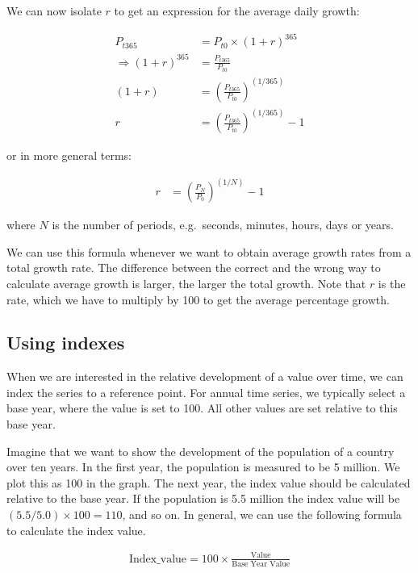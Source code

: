 \documentclass[
]{book}
\begin{document}
We can now isolate \(r\) to get an expression for the average daily growth:

\begin{align}
   P_{t365}&=P_{t0}\times(1+r)^{365}\nonumber\\
   \Rightarrow
   (1+r)^365&=\frac{P_{t365}}{P_{t0}}\nonumber\\
   (1+r)&=\left(\frac{P_{t365}}{P_{t0}}\right)^{(1/365)}\nonumber\\
   r&=\left(\frac{P_{t365}}{P_{t0}}\right)^{(1/365)}-1
\end{align}

or in more general terms:

\begin{align}
   r&=\left(\frac{P_{N}}{P_{0}}\right)^{(1/N)}-1
\end{align}

where \(N\) is the number of periods, e.g.~seconds, minutes, hours, days or years.

We can use this formula whenever we want to obtain average growth rates from a total growth rate. The difference between the correct and the wrong way to calculate average growth is larger, the larger the total growth. Note that \(r\) is the rate, which we have to multiply by 100 to get the average percentage growth.

\hypertarget{using-indexes}{%
\subsection*{Using indexes}\label{using-indexes}}

When we are interested in the relative development of a value over time, we can index the series to a reference point. For annual time series, we typically select a base year, where the value is set to 100. All other values are set relative to this base year.

Imagine that we want to show the development of the population of a country over ten years. In the first year, the population is measured to be 5 million. We plot this as 100 in the graph. The next year, the index value should be calculated relative to the base year. If the population is 5.5 million the index value will be \((5.5/5.0)\times 100=110\), and so on. In general, we can use the following formula to calculate the index value.

\begin{align}
  \text{Index\_value}=100\times \frac{\text{Value}}{\text{Base Year Value}}
\end{align}
\end{document}
